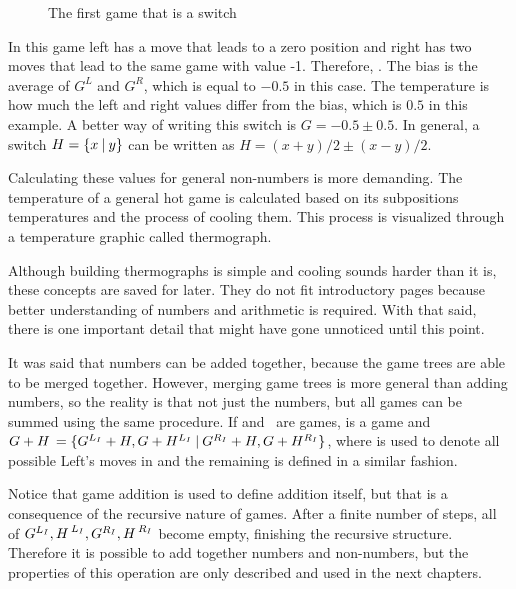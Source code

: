 \begin{figure} [!ht]
	\begin{center}
	\end{center}
	\caption{The first game that is a switch}
\end{figure}

In this game left has a move that leads to a zero position and right has two moves that lead to the same game with value -1. Therefore, . The bias is the average of $G^L$ and $G^R$, which is equal to $-0.5$ in this case. The temperature is how much the left and right values differ from the bias, which is $0.5$ in this example. A better way of writing this switch is $G = -0.5 \pm 0.5$. In general, a switch $H = \mbox{$\{x\:|\:y\}$}$ can be written as $H = (x+y)/2 \pm (x-y)/2$. 

Calculating these values for general non-numbers is more demanding. The temperature of a general hot game is calculated based on its subpositions temperatures and the process of cooling them. This process is visualized through a temperature graphic called thermograph.

Although building thermographs is simple and cooling sounds harder than it is, these concepts are saved for later. They do not fit introductory pages because better understanding of numbers and arithmetic is required. With that said, there is one important detail that might have gone unnoticed until this point.

It was said that numbers can be added together, because the game trees are able to be merged together. However, merging game trees is more general than adding numbers, so the reality is that not just the numbers, but all games can be summed using the same procedure. If \Gm{} and \Hm$\,$ are games, \Gm{ + \Hm} is a game and $\mbox{$G + \mbox{$H\,$} = \mbox{$\{G^{L_I}+H, G+H^{L_I}\:|\:G^{R_I}+H, G+H^{R_I}\}$}$}$, where  is used to denote all possible Left's moves in \Gm{} and the remaining is defined in a similar fashion.

Notice that game addition is used to define addition itself, but that is a consequence of the recursive nature of games. After a finite number of steps, all of $\mbox{$G^{L_I}$}, \mbox{$H\,$}^{L_I}, \mbox{$G^{R_I}$}, \mbox{$H\,$}^{R_I}$ become empty, finishing the recursive structure. Therefore it is possible to add together numbers and non-numbers, but the properties of this operation are only described and used in the next chapters.







